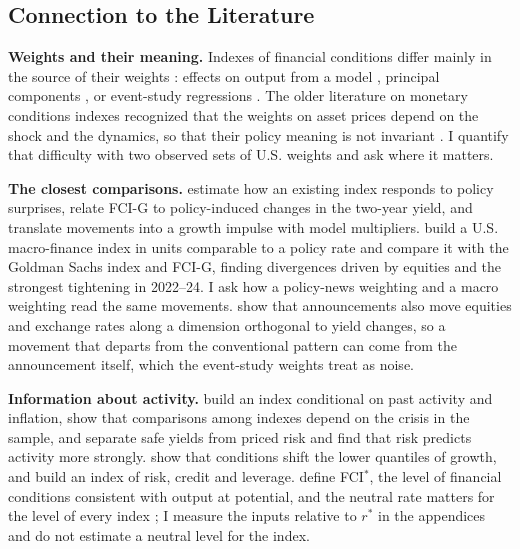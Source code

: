 \documentclass[11pt]{article}
\newcommand{\rs}{r^{*}}
\begin{document}
\subsection{Connection to the Literature}
\textbf{Weights and their meaning.} Indexes of financial conditions differ mainly in the source of their weights \citep{hatzius2010}: effects on output from a model \citep{dudley2000,hatzius2018,ajello2023}, principal components \citep{brave2011}, or event-study regressions \citep{kuttner2001,gurkaynak2005,bernanke2005,nakamura2018,bauer2023}. The older literature on monetary conditions indexes recognized that the weights on asset prices depend on the shock and the dynamics, so that their policy meaning is not invariant \citep{eika1996}. I quantify that difficulty with two observed sets of U.S. weights and ask where it matters.

\textbf{The closest comparisons.} \citet{arnaut2024} estimate how an existing index responds to policy surprises, \citet{sack2023} relate FCI-G to policy-induced changes in the two-year yield, and \citet{ajello2023} translate movements into a growth impulse with model multipliers. \citet{bletzinger2026} build a U.S. macro-finance index in units comparable to a policy rate and compare it with the Goldman Sachs index and FCI-G, finding divergences driven by equities and the strongest tightening in 2022--24. I ask how a policy-news weighting and a macro weighting read the same movements. \citet{boehm2025} show that announcements also move equities and exchange rates along a dimension orthogonal to yield changes, so a movement that departs from the conventional pattern can come from the announcement itself, which the event-study weights treat as noise.

\textbf{Information about activity.} \citet{hatzius2010} build an index conditional on past activity and inflation, \citet{aramonte2013} show that comparisons among indexes depend on the crisis in the sample, and \citet{lombardi2025} separate safe yields from priced risk and find that risk predicts activity more strongly. \citet{adrian2019} show that conditions shift the lower quantiles of growth, and \citet{brave2011} build an index of risk, credit and leverage. \citet{caballero2026} define FCI$^*$, the level of financial conditions consistent with output at potential, and the neutral rate matters for the level of every index \citep{laubach2003,holston2017,holston2023,hamilton2016,bauer2020,kiley2020}; I measure the inputs relative to $\rs$ in the appendices and do not estimate a neutral level for the index.
\FloatBarrier
\end{document}
